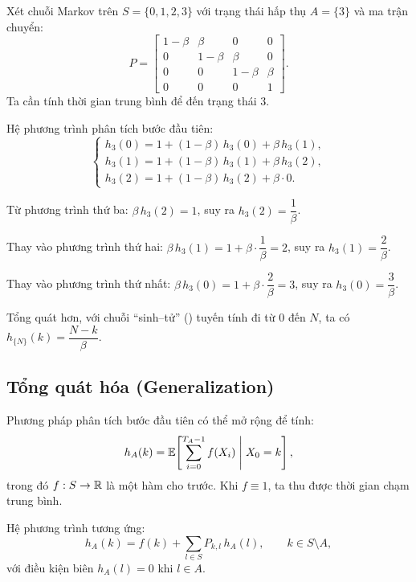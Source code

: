 \begin{example}
\label{ex:alpha-beta-hitting}
Xét chuỗi Markov trên $S = \{0, 1, 2, 3\}$ với trạng thái hấp thụ $A = \{3\}$ và ma trận chuyển:
\[
  P = \begin{bmatrix}
    1 - \beta & \beta & 0 & 0\\
    0 & 1 - \beta & \beta & 0\\
    0 & 0 & 1 - \beta & \beta\\
    0 & 0 & 0 & 1
  \end{bmatrix}.
\]
Ta cần tính thời gian trung bình để đến trạng thái $3$.

Hệ phương trình phân tích bước đầu tiên:
\[
  \begin{cases}
    h_3(0) = 1 + (1-\beta)\, h_3(0) + \beta\, h_3(1),\\
    h_3(1) = 1 + (1-\beta)\, h_3(1) + \beta\, h_3(2),\\
    h_3(2) = 1 + (1-\beta)\, h_3(2) + \beta \cdot 0.
  \end{cases}
\]

Từ phương trình thứ ba: $\beta\, h_3(2) = 1$, suy ra $h_3(2) = \dfrac{1}{\beta}$.

Thay vào phương trình thứ hai:
$\beta\, h_3(1) = 1 + \beta \cdot \dfrac{1}{\beta} = 2$, suy ra $h_3(1) = \dfrac{2}{\beta}$.

Thay vào phương trình thứ nhất:
$\beta\, h_3(0) = 1 + \beta \cdot \dfrac{2}{\beta} = 3$, suy ra $h_3(0) = \dfrac{3}{\beta}$.

Tổng quát hơn, với chuỗi ``sinh--tử'' () tuyến tính đi từ $0$ đến $N$,
ta có $h_{\{N\}}(k) = \dfrac{N - k}{\beta}$.
\end{example}

\subsection{Tổng quát hóa (Generalization)}

Phương pháp phân tích bước đầu tiên có thể mở rộng để tính:
\[
  h_A(k) = \mathbb{E}\!\left[\sum_{i=0}^{T_A - 1} f(X_i) \;\middle|\; X_0 = k\right],
\]
trong đó $f : S \to \mathbb{R}$ là một hàm cho trước. Khi $f \equiv 1$, ta thu được thời gian chạm trung bình.

Hệ phương trình tương ứng:
\begin{equation}\label{eq:generalized-hitting}
  h_A(k) = f(k) + \sum_{l \in S} P_{k,l}\, h_A(l), \qquad k \in S \setminus A,
\end{equation}
với điều kiện biên $h_A(l) = 0$ khi $l \in A$.

